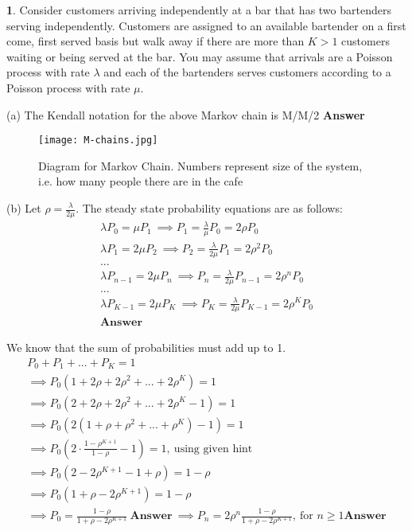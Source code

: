 \textbf{1}. Consider customers arriving independently at a bar that has two bartenders serving independently. Customers are assigned to an available bartender on a first come, first served basis
but walk away if there are more than $K > 1$ customers waiting or being served at the bar. You
may assume that arrivals are a Poisson process with rate $\lambda$ and each of the bartenders serves
customers according to a Poisson process with rate $\mu$.

(a) 
The Kendall notation for the above Markov chain is M/M/2 \textbf{Answer}
\begin{figure}[H]
\centering
\texttt{[image: M-chains.jpg]}
\caption{\label{fig:M-chains}Diagram for Markov Chain. Numbers represent size of the system, i.e. how many people there are in the cafe}
\end{figure}

(b) Let $\rho = \frac{\lambda}{2\mu}$. The steady state probability equations are as follows:
\begin{gather*}
\lambda P_0  = \mu P_1\ \implies P_1 = \frac{\lambda}{\mu}P_0 = 2\rho P_0\\
\lambda P_1 = 2\mu P_2\ \implies P_2 = \frac{\lambda}{2\mu}P_1 = 2\rho^2 P_0\\
...\\
\lambda P_{n-1} = 2\mu P_{n}\ \implies P_n = \frac{\lambda}{2\mu}P_{n-1} = 2\rho^n P_0\\
...\\
\lambda P_{K-1} = 2\mu P_{K}\ \implies P_K = \frac{\lambda}{2\mu}P_{K-1} = 2\rho^K P_0\\
\textbf{Answer}
\end{gather*}

We know that the sum of probabilities must add up to 1.
\begin{gather*}
P_0 + P_1 + ... + P_K = 1\\
\implies P_0(1 + 2\rho + 2\rho^2 + ... + 2\rho^K) = 1\\
\implies P_0(2 + 2\rho + 2\rho^2 + ... + 2\rho^K-1) = 1\\
\implies P_0(2(1 + \rho + \rho^2 + ... + \rho^K) - 1) = 1\\
\implies P_0(2\cdot \frac{1 - \rho^{K+1}}{1-\rho} - 1) = 1, \ \text{using given hint} \\
\implies P_0(2 - 2\rho^{K+1} - 1 + \rho) = 1 - \rho\\
\implies P_0(1 + \rho - 2\rho^{K+1}) = 1 - \rho\\
\implies P_0 = \frac{1-\rho}{1+\rho - 2\rho^{K+1}}\ \textbf{Answer}\ \implies P_n = 2\rho^n\frac{1-\rho}{1+\rho - 2\rho^{K+1}},\ \text{for $n\ge1$} \textbf{Answer}
\end{gather*}

